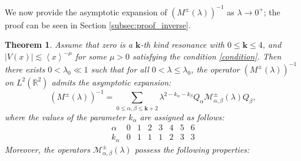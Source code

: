 \documentclass[reqno]{amsart}
\newtheorem{theorem}{Theorem}[section]
\numberwithin{equation}{section}
\begin{document}
We now provide the asymptotic expansion of $(M^\pm(\lambda))^{-1}$ as $\lambda \to 0^+$; the proof can be seen in Section \ref{subsec:proof_inverse}. 

\begin{theorem}\label{thm:M_inverse}
	Assume that zero is a $\mathbf{k}$-th kind resonance with $0 \leq \mathbf{k} \leq 4$, and $|V(x)| \lesssim \left \langle  x\right \rangle^{-\mu}$ for some $\mu>0$ satisfying the condition \eqref{condition}.
	Then there exists $0 < \lambda_0 \ll 1$ such that for all $0 < \lambda \le \lambda_0$, the operator $\left(M^{\pm}(\lambda)\right)^{-1}$ on $L^2(\mathbb{R}^2)$ admits the asymptotic expansion:
	\begin{equation}\label{eq:M_inverse}  
		\left(M^{\pm}(\lambda)\right)^{-1} = \sum_{0 \leq \alpha, \beta \leq \mathbf{k}+2} \lambda^{2-k_\alpha-k_\beta} Q_\alpha \mathcal{M}_{\alpha, \beta}^{\pm}(\lambda) Q_\beta ,  
	\end{equation}  
	where the values of the parameter $k_\alpha$ are assigned as follows:  
	\begin{equation}\label{tab:k_alpha}  
		\begin{array}{c|ccccccc}  
			\alpha & 0 & 1 & 2 & 3 & 4 & 5 & 6 \\  
			\hline  
			k_\alpha & 0 & 1 & 1 & 1 & 2 & 3 & 3  
		\end{array}  
	\end{equation}  
	Moreover, the  operators $\mathcal{M}_{\alpha, \beta}^{\pm}(\lambda)$ possess the following properties:  
	

\end{theorem}
\end{document}
